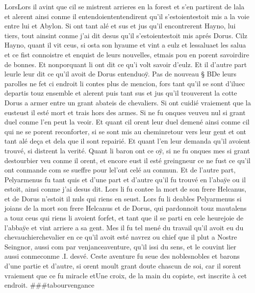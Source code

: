 \documentclass{article}
\begin{document}
\begin{pages}
   LorsLors il avint que cil
   se mistrent arrieres en la forest et s’en partirent de lala et alerent 
   ainsi conme il entendoiententendirent qu’il 
   s’estoientestoit mis a la voie 
   entre lui et Abylon. Si ont tant alé et sus et jus qu’il encontrerent 
   Hayno, lui tiers, tout ainsint conme j’ai dit desus qu’il 
   s’estoientestoit mis 
   aprés Dorus. Cilz Hayno, quant il vit ceus, si osta son hyaume et 
   vint a eulz et lessaluaet les salua et ce fist connoistre 
   et enquist de leurs nouvelles, etmais pou en porent 
   savoirdire de bonnes. Et nonporquant li ont dit ce qu’i volt savoir d’eulz. 
   Et il d’autre part leurle leur dit ce qu’il avoit 
      de Dorus entenduoÿ. \pend
\pstart Pas de nouveau § BDe leurs parolles ne fet ci endroit 
   li contes plus de mencion, fors tant qu’il se sont d’iluec departis touz ensemble et alerent puis tant sus et jus qu’il 
   trouverent la cotte Dorus a armer entre un grant abateis de chevaliers. Si ont cuidié vraiement que 
   la eusteust il esté mort et trais 
      hors des armes. Si ne fu onques veuveu nul si grant duel conme 
   l’en peut la veoir. Et quant cil orent leur duel demené ainsi conme cil qui ne se porent reconforter, si se sont mis au 
   cheminretour vers leur gent et ont tant alé deça et dela que il sont 
   repairié. Et quant l’en leur demanda qu’il avoient trouvé, si distrent la verité. \pend
\pstart Quant li baron ont ce oÿ, si ne fu onques mes si grant destourbier veu conme il orent, et encore eust 
   il esté greingneur ce ne fust ce qu’il ont conmande com se sueffre pour lel'ont celé au 
   conmun. Et de l’autre part, Pelyarmenus fu tant quis et d’une part et d’autre qu’il fu trouvé en 
   l’abaÿe ou il estoit, ainsi conme j’ai desus dit. 
   Lors li fu contee la mort de son frere Helcanus, et de Dorus 
   n’estoit il nuls qui riens en seust. Lors fu li deables 
   Pelyarmenus si joians de la mort 
   son frere Helcanus et de 
      Dorus, qui pardonnoit touz mautalens a touz ceus qui 
   riens 
   li avoient forfet, et tant que il se parti en cele heurejoie de 
   l’abbaÿe et vint arriere a sa gent. Mes il fu tel mené du travail qu’il avoit eu du 
   chevauchierchevalier en ce qu’il avoit esté navrez ou chief que il plut a 
   Nostre Seingnor, aussi com par venjanceaventure, qu’il issi du sens, et le couvint lier aussi 
   conmeconme .I. desvé. Ceste aventure fu seue des 
   noblesnobles et barons d’une partie 
   et d’autre, si orent moult grant doute chascun de soi, car il sorent vraiement que ce fu 
   miracle etUne croix, de la main du copiste, est inscrite à cet endroit. ###tabourvengance 

\end{pages}
\end{document}
